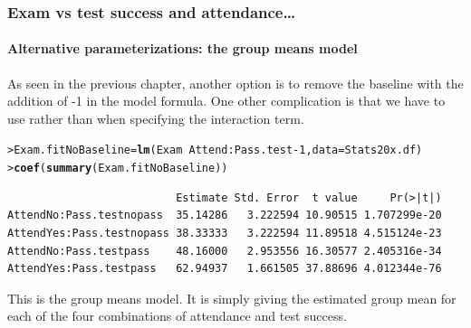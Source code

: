 \documentclass{beamer}\usepackage[]{graphicx}\usepackage[]{xcolor}
\makeatletter
\newcommand{\hlnum}[1]{\textcolor[rgb]{0.686,0.059,0.569}{#1}}%
\newcommand{\hlopt}[1]{\textcolor[rgb]{0,0,0}{#1}}%
\newcommand{\hlstd}[1]{\textcolor[rgb]{0.345,0.345,0.345}{#1}}%
\newcommand{\hlkwb}[1]{\textcolor[rgb]{0.69,0.353,0.396}{#1}}%
\newcommand{\hlkwc}[1]{\textcolor[rgb]{0.333,0.667,0.333}{#1}}%
\newcommand{\hlkwd}[1]{\textcolor[rgb]{0.737,0.353,0.396}{\textbf{#1}}}%
\newenvironment{kframe}{%
 \def\at@end@of@kframe{}%
 \ifinner\ifhmode%
  \def\at@end@of@kframe{\end{minipage}}%
  \begin{minipage}{\columnwidth}%
 \fi\fi%
 \def\FrameCommand##1{\hskip\@totalleftmargin \hskip-\fboxsep
 \colorbox{shadecolor}{##1}\hskip-\fboxsep
     \hskip-\linewidth \hskip-\@totalleftmargin \hskip\columnwidth}%
 \MakeFramed {\advance\hsize-\width
   \@totalleftmargin\z@ \linewidth\hsize
   \@setminipage}}%
 {\par\unskip\endMakeFramed%
 \at@end@of@kframe}
\newenvironment{knitrout}{}{} %
\makeatother
\begin{document}
\begin{frame}[fragile]
\frametitle{Exam vs test success and attendance\ldots}
\framesubtitle{Alternative parameterizations: the group means model}

As seen in the previous chapter, another option is to remove the baseline
with the addition of -1 in the model formula. 
One other complication is that we have to use \rcode{:} rather than \rcode{*} when specifying the interaction term.
\bigskip

\begin{knitrout}\scriptsize
{}\color{fgcolor}\begin{kframe}
\begin{alltt}
\hlstd{> }\hlstd{Exam.fitNoBaseline}\hlkwb{=}\hlkwd{lm}\hlstd{(Exam}\hlopt{~}\hlstd{Attend}\hlopt{:}\hlstd{Pass.test}\hlopt{-}\hlnum{1}\hlstd{,}\hlkwc{data}\hlstd{=Stats20x.df)}
\hlstd{> }\hlkwd{coef}\hlstd{(}\hlkwd{summary}\hlstd{(Exam.fitNoBaseline))}
\end{alltt}
\begin{verbatim}
                          Estimate Std. Error  t value     Pr(>|t|)
AttendNo:Pass.testnopass  35.14286   3.222594 10.90515 1.707299e-20
AttendYes:Pass.testnopass 38.33333   3.222594 11.89518 4.515124e-23
AttendNo:Pass.testpass    48.16000   2.953556 16.30577 2.405316e-34
AttendYes:Pass.testpass   62.94937   1.661505 37.88696 4.012344e-76
\end{verbatim}
\end{kframe}
\end{knitrout}

This is the group means model. It is simply giving the estimated group mean for each of the four combinations of attendance and test success.
\bigskip


\end{frame}
\end{document}
